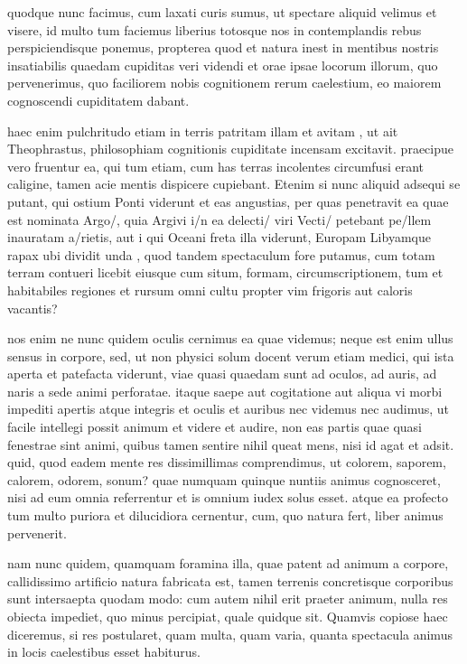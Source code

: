  quodque nunc facimus, cum laxati curis sumus, ut spectare aliquid velimus et visere, id multo tum faciemus liberius totosque nos in contemplandis rebus perspiciendisque ponemus, propterea quod et natura inest in mentibus nostris insatiabilis quaedam cupiditas veri videndi et orae ipsae locorum illorum, quo pervenerimus, quo faciliorem nobis cognitionem rerum caelestium, eo maiorem cognoscendi cupiditatem dabant.

 haec enim pulchritudo etiam in terris patritam illam et avitam , ut ait Theophrastus, philosophiam cognitionis cupiditate incensam excitavit. praecipue vero fruentur ea, qui tum etiam, cum has terras incolentes circumfusi erant caligine, tamen acie mentis dispicere cupiebant. Etenim si nunc aliquid adsequi se putant, qui ostium Ponti viderunt et eas angustias, per quas penetravit ea quae est nominata Argo/, quia Argivi i/n ea delecti/ viri Vecti/ petebant pe/llem inauratam a/rietis, aut i qui Oceani freta illa viderunt, Europam Libyamque rapax ubi dividit unda , quod tandem spectaculum fore putamus, cum totam terram contueri licebit eiusque cum situm, formam, circumscriptionem, tum et habitabiles regiones et rursum omni cultu propter vim frigoris aut caloris vacantis?

 nos enim ne nunc quidem oculis cernimus ea quae videmus; neque est enim ullus sensus in corpore, sed, ut non physici solum docent verum etiam medici, qui ista aperta et patefacta viderunt, viae quasi quaedam sunt ad oculos, ad auris, ad naris a sede animi perforatae. itaque saepe aut cogitatione aut aliqua vi morbi impediti apertis atque integris et oculis et auribus nec videmus nec audimus, ut facile intellegi possit animum et videre et audire, non eas partis quae quasi fenestrae sint animi, quibus tamen sentire nihil queat mens, nisi id agat et adsit. quid, quod eadem mente res dissimillimas comprendimus, ut colorem, saporem, calorem, odorem, sonum? quae numquam quinque nuntiis animus cognosceret, nisi ad eum omnia referrentur et is omnium iudex solus esset. atque ea profecto tum multo puriora et dilucidiora cernentur, cum, quo natura fert, liber animus pervenerit.

 nam nunc quidem, quamquam foramina illa, quae patent ad animum a corpore, callidissimo artificio natura fabricata est, tamen terrenis concretisque corporibus sunt intersaepta quodam modo: cum autem nihil erit praeter animum, nulla res obiecta impediet, quo minus percipiat, quale quidque sit. Quamvis copiose haec diceremus, si res postularet, quam multa, quam varia, quanta spectacula animus in locis caelestibus esset habiturus.

